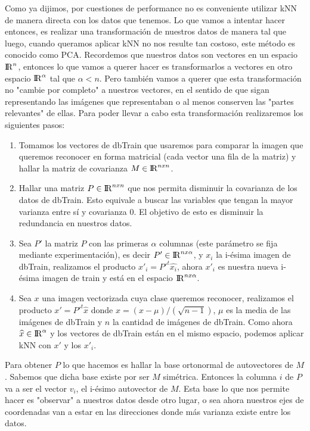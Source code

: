 \par Como ya dijimos, por cuestiones de performance no es conveniente utilizar kNN de manera directa con los datos que tenemos. Lo que vamos a intentar hacer entonces, es realizar una transformación de nuestros datos de manera tal que luego, cuando queramos aplicar kNN no nos resulte tan costoso, este método es conocido como PCA. Recordemos que nuestros datos son vectores en un espacio ${\rm I\!R}^n$, entonces lo que vamos a querer hacer es transformarlos a vectores en otro espacio ${\rm I\!R}^\alpha$ tal que $\alpha < n$. Pero también vamos a querer que esta transformación no "cambie por completo" a nuestros vectores, en el sentido de que sigan representando las imágenes que representaban o al menos conserven las "partes relevantes" de ellas. Para poder llevar a cabo esta transformación realizaremos los siguientes pasos:

\begin{enumerate}
\item Tomamos los vectores de dbTrain que usaremos para comparar la imagen que queremos reconocer en forma matricial (cada vector una fila de la matriz) y hallar la matriz de covarianza $M \in {\rm I\!R}^{nxn}$.
\item Hallar una matriz $P \in {\rm I\!R}^{nxn}$ que nos permita disminuir la covarianza de los datos de dbTrain. Esto equivale a buscar las variables que tengan la mayor varianza entre sí y covarianza 0. El objetivo de esto es disminuir la redundancia en nuestros datos.
\item Sea $P'$ la matriz $P$ con las primeras $\alpha$ columnas (este parámetro se fija mediante experimentación), es decir $P' \in {\rm I\!R}^{nx\alpha}$, y $x_i$ la i-ésima imagen de dbTrain, realizamos el producto $x'_i = P'^t \widehat{x_i}$, ahora $x'_i$ es nuestra nueva i-ésima imagen de train y está en el espacio ${\rm I\!R}^{nx\alpha}$.
\item Sea $x$ una imagen vectorizada cuya clase queremos reconocer, realizamos el producto $x'= P'^t\widehat{x}$ donde $\widehat{x} = (x - \mu) / (\sqrt{n - 1})$, $\mu$ es la media de las imágenes de dbTrain y $n$ la cantidad de imágenes de dbTrain. Como ahora $\widehat{x} \in {\rm I\!R}^{\alpha}$ y los vectores de dbTrain están en el mismo espacio, podemos aplicar kNN con $x'$ y los $x'_i$.
\end{enumerate}

Para obtener $P$ lo que hacemos es hallar la base ortonormal de autovectores de $M$. Sabemos que dicha base existe por ser $M$ simétrica. Entonces la columna $i$ de $P$ va a ser el vector $v_i$, el i-ésimo autovector de $M$. Esta base lo que nos permite hacer es "observar" a nuestros datos desde otro lugar, o sea ahora nuestros ejes de coordenadas van a estar en las direcciones donde más varianza existe entre los datos.

